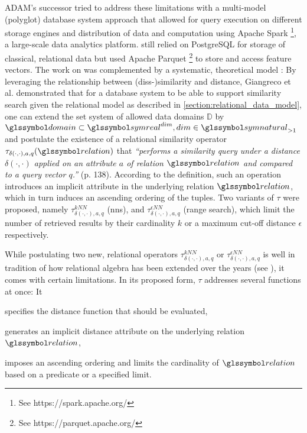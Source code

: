 ADAM's successor \adampro{} \cite{Giangreco:2016Adam} tried to address these limitations with a multi-model (polyglot) database system approach that allowed for query execution on different storage engines and distribution of data and computation using Apache Spark \footnote{See https://spark.apache.org/}, a large-scale data analytics platform. \adampro{} still relied on PostgreSQL for storage of classical, relational data but used Apache Parquet \footnote{See https://parquet.apache.org/} to store and access feature vectors. The work on \adampro{} was complemented by a systematic, theoretical model \cite{Giangreco:2018Database}: By leveraging the relationship between (diss-)similarity and distance, Giangreco et al. demonstrated that for a database system to be able to support similarity search given the relational model as described in \cref{section:relational_data_model}, one can extend the set system of allowed data domains $\mathbb{D}$ by $\domain \subset \symreal^{dim}, dim \in \symnatural_{>1}$ and postulate the existence of a relational similarity operator $\tau_{\delta(\cdot,\cdot),a,q}(\relation)$ that \emph{``performs a similarity query under a distance $\delta(\cdot,\cdot)$ applied on an attribute $a$ of relation $\relation$ and compared to a query vector $q$.''} \cite{Giangreco:2018Database} (p. 138). According to the definition, such an operation introduces an implicit attribute in the underlying relation $\relation$, which in turn induces an ascending ordering of the tuples. Two variants of $\tau$ were proposed, namely $\tau^{kNN}_{\delta(\cdot,\cdot),a,q}$ (\acrshort{nns}), and $\tau^{\epsilon NN}_{\delta(\cdot,\cdot),a,q}$ (range search), which limit the number of retrieved results by their cardinality $k$ or a maximum cut-off distance $\epsilon$ respectively.

While postulating two new, relational operators $\tau^{kNN}_{\delta(\cdot,\cdot),a,q}$ or $\tau^{\epsilon NN}_{\delta(\cdot,\cdot),a,q}$ is well in tradition of how relational algebra has been extended over the years (see ), it comes with certain limitations. In its proposed form, $\tau$ addresses several functions at once: It
\begin{enumerate*}[label=(\roman*)]
    \item specifies the distance function that should be evaluated,
    \item generates an implicit distance attribute on the underlying relation $\relation$,
    \item imposes an ascending ordering and limits the cardinality of $\relation$ based on a predicate or a specified limit.
\end{enumerate*}

